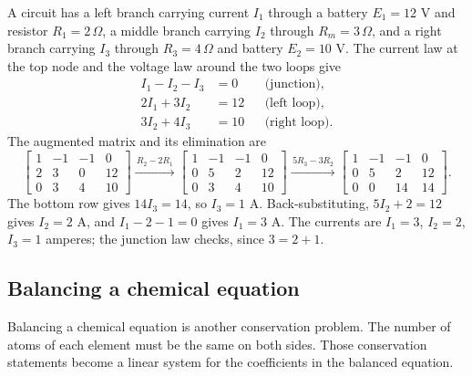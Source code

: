 \documentclass[12pt]{book}
\begin{document}
\begin{example}
A circuit has a left branch carrying current $I_1$ through a battery $E_1=12$ V and
resistor $R_1=2\,\Omega$, a middle branch carrying $I_2$ through $R_m=3\,\Omega$, and
a right branch carrying $I_3$ through $R_3=4\,\Omega$ and battery $E_2=10$ V. The
current law at the top node and the voltage law around the two loops give
\[
\begin{aligned}
I_1-I_2-I_3&=0 &&\text{(junction)},\\
2I_1+3I_2&=12 &&\text{(left loop)},\\
3I_2+4I_3&=10 &&\text{(right loop)}.
\end{aligned}
\]
The augmented matrix and its elimination are
\[
\left[\begin{array}{ccc|c}
1&-1&-1&0\\ 2&3&0&12\\ 0&3&4&10
\end{array}\right]
\xrightarrow{\,R_2-2R_1\,}
\left[\begin{array}{ccc|c}
1&-1&-1&0\\ 0&5&2&12\\ 0&3&4&10
\end{array}\right]
\xrightarrow{\,5R_3-3R_2\,}
\left[\begin{array}{ccc|c}
1&-1&-1&0\\ 0&5&2&12\\ 0&0&14&14
\end{array}\right].
\]
The bottom row gives $14I_3=14$, so $I_3=1$ A. Back-substituting, $5I_2+2=12$ gives
$I_2=2$ A, and $I_1-2-1=0$ gives $I_1=3$ A. The currents are $I_1=3$, $I_2=2$,
$I_3=1$ amperes; the junction law checks, since $3=2+1$.
\end{example}

\subsection{Balancing a chemical equation}

Balancing a chemical equation is another conservation problem. The number of atoms of
each element must be the same on both sides. Those conservation statements become a
linear system for the coefficients in the balanced equation.
\end{document}
